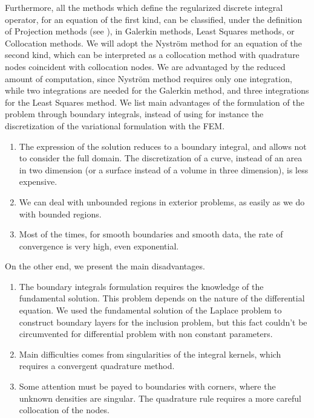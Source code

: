 \documentclass[10pt, a4paper, twoside, openright]{book}
\theoremstyle{definition}
\theoremstyle{plain}
\theoremstyle{plain}
\theoremstyle{plain}
\theoremstyle{plain}
\theoremstyle{plain}
\theoremstyle{plain}
\theoremstyle{plain}
\theoremstyle{plain}
\begin{document}
Furthermore, all the methods which define the regularized discrete integral operator, 
for an equation of the first kind,
can be classified, under the definition of Projection methods 
(see \cite{kirsch:book}), in Galerkin methods, Least Squares methods, or 
Collocation methods. We will adopt the Nystr\"{o}m method for an equation 
of the second kind, which can be interpreted as a 
collocation method with quadrature nodes coincident with collocation nodes. 
We are advantaged by the reduced amount of computation, since Nystr\"{o}m method requires only 
one integration, while two integrations are needed for the Galerkin method, and three 
integrations for the Least Squares method.
We list main advantages of the formulation of the problem through boundary integrals, 
instead of using for instance the discretization of the variational formulation with the FEM.
\begin{enumerate}
 \item The expression of the solution reduces to a boundary integral,
 and allows not to consider the full domain. The discretization of a curve, instead of an area 
 in two dimension (or a surface instead of a volume in three dimension), is less expensive.
 \item We can deal with unbounded regions in exterior problems, as easily as we do with bounded regions.
 \item Most of the times, for smooth boundaries and smooth data, the rate of convergence is very high, even exponential.
\end{enumerate}
On the other end, we present the main disadvantages.
\begin{enumerate}
 \item The boundary integrals formulation requires the knowledge of the fundamental solution. 
 This problem depends on the nature of the differential equation. 
 We used the fundamental solution of the Laplace problem to construct boundary layers 
 for the inclusion problem, but this fact couldn't be circumvented for 
 differential problem with non constant parameters.
 \item Main difficulties comes from singularities of the integral kernels, 
 which requires a convergent quadrature method.
 \item Some attention must be payed to boundaries with corners, 
 where the unknown densities are singular. The quadrature rule requires a more 
 careful collocation of the nodes.
\end{enumerate}
\end{document}

